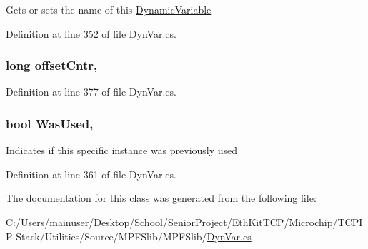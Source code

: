 Gets or sets the name of this \hyperlink{class_microchip_1_1_dynamic_variable}{Dynamic\+Variable} 



Definition at line 352 of file Dyn\+Var.\+cs.

\hypertarget{class_microchip_1_1_dynamic_variable_a55857d3965a9d433905e7dae69121204}{}
\subsubsection[{offset\+Cntr}]{\setlength{\rightskip}{0pt plus 5cm}long offset\+Cntr\hspace{0.3cm}{\ttfamily [get]}, {\ttfamily [set]}}\label{class_microchip_1_1_dynamic_variable_a55857d3965a9d433905e7dae69121204}


Definition at line 377 of file Dyn\+Var.\+cs.

\hypertarget{class_microchip_1_1_dynamic_variable_af7928a8976847da930bdabe61a1d69cb}{}
\subsubsection[{Was\+Used}]{\setlength{\rightskip}{0pt plus 5cm}bool Was\+Used\hspace{0.3cm}{\ttfamily [get]}, {\ttfamily [set]}}\label{class_microchip_1_1_dynamic_variable_af7928a8976847da930bdabe61a1d69cb}




Indicates if this specific instance was previously used 

Definition at line 361 of file Dyn\+Var.\+cs.



The documentation for this class was generated from the following file\+:\begin{DoxyCompactItemize}
\item 
C\+:/\+Users/mainuser/\+Desktop/\+School/\+Senior\+Project/\+Eth\+Kit\+T\+C\+P/\+Microchip/\+T\+C\+P\+I\+P Stack/\+Utilities/\+Source/\+M\+P\+F\+Slib/\+M\+P\+F\+Slib/\hyperlink{_dyn_var_8cs}{Dyn\+Var.\+cs}\end{DoxyCompactItemize}
